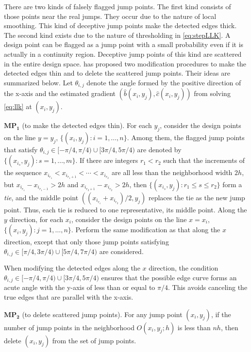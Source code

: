 There are two kinds of falsely flagged jump points. The first kind consists of those points near the real jumps. They occur due to the nature of local smoothing. This kind of deceptive jump points make the detected edges thick. The second kind exists due to the nature of thresholding in \eqref{eq:stepLLK}. A design point can be flagged as a jump point with a small probability even if it is actually in a continuity region. Deceptive jump points of this kind are scattered in the entire design space. \citet{qiu1997jump} has proposed two modification procedures to make the detected edges thin and to delete the scattered jump points. Their ideas are summarized below. Let \(\theta_{i, j}\) denote the angle formed by the positive direction of the x-axis and the estimated gradient \((\widehat{b}(x_i, y_j), \widehat{c}(x_i, y_j))\) from solving \eqref{eq:llk} at \((x_i, y_j)\).

\(\mathrm{\mathbf{MP}}_\mathbf{1}\) (to make the detected edges thin). For each \(y_j\), consider the design points on the line \(y = y_j\), \(\{(x_i, y_j): i = 1, \ldots, n \}\). Among them, the flagged jump points that satisfy \(\theta_{i, j} \in [-\pi/4, \pi/4) \cup [3\pi/4, 5\pi/4)\) are denoted by \(\{(x_{i_s}, y_j): s = 1, \ldots, m \}\). If there are integers \(r_1 < r_2\) such that the increments of the sequence \(x_{i_{r_1}} < x_{i_{r_1 + 1}} < \cdots < x_{i_{r_2}}\) are all less than the neighborhood width \(2h\), but \(x_{i_{r_1}} - x_{i_{r_1 - 1}} > 2h\) and \(x_{i_{r_2 + 1}} - x_{i_{r_2}} > 2h\), then \(\{(x_{i_s}, y_j): r_1 \leq s \leq r_2 \}\) form a \textit{tie}, and the middle point \(((x_{i_{r_1}} + x_{i_{r_2}})/2, y_j)\) replaces the tie as the new jump point. Thus, each tie is reduced to one representative, its middle point. Along the \(y\) direction, for each \(x_i\), consider the design points on the line \(x = x_i\), \(\{(x_i, y_j): j = 1, \ldots, n  \}\). Perform the same modification as that along the \(x\) direction, except that only those jump points satisfying \(\theta_{i, j} \in [\pi/4, 3\pi/4) \cup [5\pi/4, 7\pi/4)\) are considered.

When modifying the detected edges along the \(x\) direction, the condition \(\theta_{i, j} \in [-\pi/4, \pi/4) \cup [3\pi/4, 5\pi/4)\) ensures that the possible edge curve forms an acute angle with the y-axis of less than or equal to \(\pi/4\). This avoids canceling the true edges that are parallel with the x-axis.

\(\mathrm{\mathbf{MP}}_\mathbf{2}\) (to delete scattered jump points). For any jump point \((x_i, y_j)\), if the number of jump points in the neighborhood \(O(x_i, y_j; h)\) is less than \(nh\), then delete \((x_i, y_j)\) from the set of jump points.

